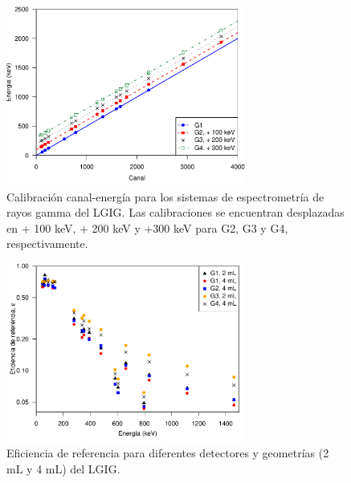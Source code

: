 \begin{figure}[h]
\centering
\includegraphics[width=0.7\textwidth]{Imagenes/Calibraciones_Canal_Energia.pdf}
\caption{Calibración canal-energía para los sistemas de espectrometría de rayos gamma del LGIG. Las calibraciones se encuentran desplazadas en + 100 keV, + 200 keV y +300 keV para G2, G3 y G4, respectivamente.}\label{Fig-Cal-Canal-Energia}
\end{figure}
\begin{figure}[h]
\centering
\includegraphics[width=0.7\textwidth]{Imagenes/Eficiencia_agua.pdf}
\caption{Eficiencia de referencia para diferentes detectores y geometrías (2 mL y 4 mL) del LGIG.}\label{Fig-EficienciaAgua}
\end{figure}

